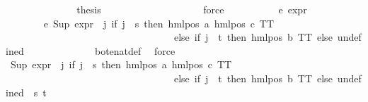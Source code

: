 \begin{isabellebody}
\ \ \ \ \ \ \isamarkupfalse%
\isanewline
\ \ \ \ \ \ \isamarkupfalse%
\ {\isacharquery}{\kern0pt}thesis\isanewline
\ \ \ \ \ \ \ \ \isamarkupfalse%
\ {\isasymphi}\isanewline
\ \ \ \ \ \ \ \ \isamarkupfalse%
\ force\isanewline
\ \ \ \ \isamarkupfalse%
\isanewline
\isanewline
\ \ \ \ \isamarkupfalse%
\ e{}{\isacharcolon}{\kern0pt}\ {\isachardoublequoteopen}expr{\isacharunderscore}{\kern0pt}{}\ {\isasymphi}\ {\isacharequal}{\kern0pt}\ {}{\isachardoublequoteclose}\isanewline
\ \ \ \ \isamarkupfalse%
{\isacharminus}{\kern0pt}\isanewline
\ \ \ \ \ \ \isamarkupfalse%
\ e{}{\isacharunderscore}{\kern0pt}{}{\isacharcolon}{\kern0pt}\ {\isachardoublequoteopen}Sup\ {\isacharparenleft}{\kern0pt}{\isacharparenleft}{\kern0pt}expr{\isacharunderscore}{\kern0pt}{}\ {\isasymcirc}\ {\isacharparenleft}{\kern0pt}{\isasymlambda}j{\isachardot}{\kern0pt}\ if\ j\ {\isacharequal}{\kern0pt}\ s\ then\ hml{\isacharunderscore}{\kern0pt}pos\ a\ {\isacharparenleft}{\kern0pt}hml{\isacharunderscore}{\kern0pt}pos\ c\ TT{\isacharparenright}{\kern0pt}\isanewline
\ \ \ \ \ \ \ \ \ \ \ \ \ \ \ \ \ \ \ \ \ \ \ \ \ \ \ \ \ \ \ \ \ \ else\ if\ j\ {\isacharequal}{\kern0pt}\ t\ then\ hml{\isacharunderscore}{\kern0pt}pos\ b\ TT\ else\ undefined{\isacharparenright}{\kern0pt}{\isacharparenright}{\kern0pt}\ {\isacharbackquote}{\kern0pt}\ {\isacharbraceleft}{\kern0pt}{\isacharbraceright}{\kern0pt}{\isacharparenright}{\kern0pt}\ {\isacharequal}{\kern0pt}\ {}{\isachardoublequoteclose}\isanewline
\ \ \ \ \ \ \ \ \isamarkupfalse%
\ bot{\isacharunderscore}{\kern0pt}enat{\isacharunderscore}{\kern0pt}def\ \isamarkupfalse%
\ force\ \isanewline
\ \ \ \ \ \ \isamarkupfalse%
\ {\isachardoublequoteopen}Sup\ {\isacharparenleft}{\kern0pt}{\isacharparenleft}{\kern0pt}{\isacharparenleft}{\kern0pt}expr{\isacharunderscore}{\kern0pt}{}\ {\isasymcirc}\ {\isacharparenleft}{\kern0pt}{\isasymlambda}j{\isachardot}{\kern0pt}\ if\ j\ {\isacharequal}{\kern0pt}\ s\ then\ hml{\isacharunderscore}{\kern0pt}pos\ a\ {\isacharparenleft}{\kern0pt}hml{\isacharunderscore}{\kern0pt}pos\ c\ TT{\isacharparenright}{\kern0pt}\isanewline
\ \ \ \ \ \ \ \ \ \ \ \ \ \ \ \ \ \ \ \ \ \ \ \ \ \ \ \ \ \ \ \ \ \ else\ if\ j\ {\isacharequal}{\kern0pt}\ t\ then\ hml{\isacharunderscore}{\kern0pt}pos\ b\ TT\ else\ undefined{\isacharparenright}{\kern0pt}{\isacharparenright}{\kern0pt}\ {\isacharbackquote}{\kern0pt}\ {\isacharbraceleft}{\kern0pt}s{\isacharcomma}{\kern0pt}\ t{\isacharbraceright}{\kern0pt}{\isacharparenright}{\kern0pt}{\isacharparenright}{\kern0pt}\ {\isacharequal}{\kern0pt}\ {}{\isachardoublequoteclose}\isanewline

\end{isabellebody}
